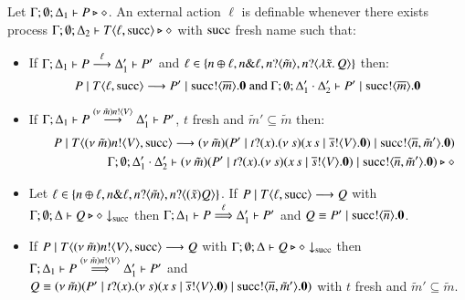 \begin{definition}[Definibility]\rm
	Let $\Gamma; \emptyset; \Delta_1 \vdash P \triangleright \diamond$.
	An external action $\ell$ is definable whenever
	there exists process
	$\Gamma; \emptyset; \Delta_2 \vdash T\langle \ell, \textrm{succ} \rangle \triangleright \diamond$
	with $\textrm{succ}$ fresh name %
	such that:
%
	\begin{itemize}
		\item	If $\Gamma; \Delta_1 \vdash P \stackrel{\ell}{\longrightarrow} \Delta_1' \vdash P'$ and
			$\ell \in \{n \oplus \ell, n \& \ell, n ? \langle \tilde{m} \rangle, n ? \langle \lambda \tilde{x}.\,Q \rangle\}$
			then:
%
		\[
			P \;|\; T\langle \ell, \textrm{succ} \rangle \longrightarrow P' \;|\; \textrm{succ} ! \langle \overline{m} \rangle . \mathbf{0} \textrm{ and }
			\Gamma; \emptyset; \Delta_1' \cdot \Delta_2' \vdash P' \;|\; \textrm{succ} ! \langle \overline{m} \rangle . \mathbf{0}
		\]
%
		\item	If $\Gamma; \Delta_1 \vdash P \stackrel{(\nu\ \tilde{m})n ! \langle V \rangle}{\longrightarrow} \Delta_1' \vdash P'$,
			$t$ fresh
			and $\tilde{m}' \subseteq \tilde{m}$
			then:
%
			\begin{eqnarray*}
				& & P \;|\; T\langle (\nu\ \tilde{m})n ! \langle V \rangle, \textrm{succ} \rangle \longrightarrow
				(\nu\ \tilde{m})(P' \;|\; t ? (x) . (\nu\ s)(x\,s \;|\; \overline{s} ! \langle V \rangle . \mathbf{0}) \;|\; \textrm{succ} ! \langle \overline{n}, \tilde{m}' \rangle . \mathbf{0})\\
				& & \Gamma; \emptyset; \Delta_1' \cdot \Delta_2' \vdash
				(\nu\ \tilde{m})(P' \;|\; t ? (x) . (\nu\ s)(x\,s \;|\; \overline{s} ! \langle V \rangle . \mathbf{0}) \;|\;  \textrm{succ} ! \langle \overline{n}, \tilde{m}' \rangle . \mathbf{0}) \triangleright \diamond\\
			\end{eqnarray*}

		\item	Let $\ell \in \{n \oplus \ell, n \& \ell, n ? \langle \tilde{m} \rangle, n ? \langle (\tilde{x}) Q \rangle\}$.
			If $P \;|\; T\langle \ell, \textrm{succ} \rangle \longrightarrow Q$ with			
			$\Gamma; \emptyset; \Delta \vdash Q \triangleright \diamond \downarrow_{\textrm{succ}}$ then 
			$\Gamma; \Delta_1 \vdash P \stackrel{\ell}{\Longrightarrow} \Delta_1' \vdash P'$
			and $Q \equiv P' \;|\; \textrm{succ} ! \langle \overline{n} \rangle . \mathbf{0}$.

		\item	If $P \;|\; T\langle (\nu\ \tilde{m})n ! \langle V \rangle, \textrm{succ} \rangle \longrightarrow Q$
			with $\Gamma; \emptyset; \Delta \vdash Q \triangleright \diamond \downarrow_{\textrm{succ}}$ then
			$\Gamma; \Delta_1 \vdash P \stackrel{(\nu\ \tilde{m})n ! \langle V \rangle}{\Longrightarrow} \Delta_1' \vdash P'$
			and $Q \equiv (\nu\ \tilde{m})(P' \;|\; t ? (x) . (\nu\ s)(x\,s \;|\; \overline{s} ! \langle V \rangle . \mathbf{0}) \;|\; \textrm{succ} ! \langle \overline{n}, \tilde{m}' \rangle . \mathbf{0})$
			with $t$ fresh and $\tilde{m}' \subseteq \tilde{m}$.
	\end{itemize}	
%
\end{definition}

